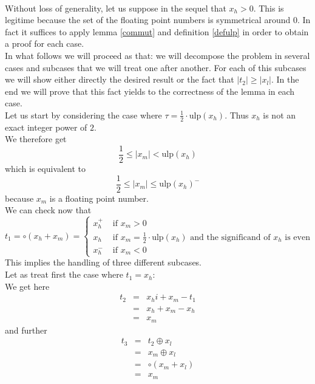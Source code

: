 \documentclass[a4paper,10pt,twoside]{article}
\newenvironment{proof}[1][Proof]{\begin{trivlist}
\item[\hskip \labelsep {\bfseries #1}]}{\end{trivlist}}
\newcommand{\hi}{\ensuremath{\mathit{h}}}
\newcommand{\mi}{\ensuremath{\mathit{m}}}
\newcommand{\lo}{\ensuremath{\mathit{l}}}
\newcommand{\mUlp}{\ensuremath{\mathrm{ulp}}}
\begin{document}
\begin{proof} ~ \\
Without loss of generality, let us suppose in the sequel that $x_\hi > 0$. This is legitime because the set of the
floating point numbers is symmetrical around $0$. In fact it suffices to apply lemma \ref{commut} and
definition \ref{defulp} in order to obtain a proof for each case.\\
In what follows we will proceed as that: we will decompose the problem in several cases and subcases that we will
treat one after another. For each of this subcases we will show either directly the desired result or the fact that
$\left \vert t_2 \right \vert \geq \left \vert x_\lo \right \vert$.
In the end we will prove that this fact yields to the correctness of the lemma in each case.\\
Let us start by considering the case where $\tau = \frac{1}{2} \cdot \mUlp\left( x_\hi \right)$.
Thus $x_\hi$ is not an exact integer power of $2$.\\
We therefore get
$$\frac{1}{2} \leq \left \vert x_\mi \right \vert < \mUlp\left( x_\hi \right)$$
which is equivalent to
$$\frac{1}{2} \leq \left \vert x_\mi \right \vert \leq \mUlp\left( x_\hi \right)^-$$
because $x_\mi$ is a floating point number.\\
We can check now that
$$t_1 = \circ \left( x_\hi + x_\mi \right) = \left \lbrace \begin{array}{ll}
x_\hi^+ & \mbox{ if } x_\mi > 0 \\
x_\hi & \mbox{ if } x_\mi = \frac{1}{2} \cdot \mUlp\left( x_\hi \right) \mbox{ and the significand of } x_\hi \mbox{ is even} \\
x_\hi^- & \mbox{ if } x_\mi < 0
\end{array} \right.$$
This implies the handling of three different subcases. \\
Let as treat first the case where $t_1 = x_\hi$: \\
We get here
\begin{eqnarray*}
t_2 & = & x_hi + x_\mi - t_1 \\
& = & x_\hi + x_\mi - x_\hi \\
& = & x_\mi
\end{eqnarray*}
and further
\begin{eqnarray*}
t_3 & = & t_2 \oplus x_\lo \\
& = & x_\mi \oplus x_\lo \\
& = & \circ \left( x_\mi + x_\lo \right) \\
& = & x_\mi
\end{eqnarray*}

\end{proof}
\end{document}
